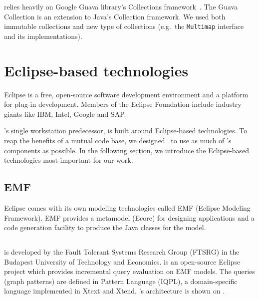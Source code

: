 \iqd{} relies heavily on Google Guava library's Collections framework~\cite{guava}. The Guava Collection is an extension to Java's Collection framework. We used both immutable collections and new type of collections (e.g.\ the \texttt{Multimap} interface and its implementations).

\section{Eclipse-based technologies}

Eclipse is a free, open-source software development environment and a platform for plug-in development. Members of the Eclipse Foundation include industry giants like IBM, Intel, Google and SAP.

\iqd{}'s single workstation predecessor, \eiq{} is built around Eclipse-based technologies. To reap the benefits of a mutual code base, we designed \iqd\ to use as much of \eiq's components as possible. In the following section, we introduce the Eclipse-based technologies most important for our work.

\subsection{EMF}
\label{subsec:EMF}

Eclipse comes with its own modeling technologies called EMF (Eclipse Modeling Framework). EMF provides a metamodel (Ecore) for designing applications and a code generation facility to produce the Java classes for the model.

\subsection{\eiq{}}
\label{subsec:eiq}

\eiq{} is developed by the Fault Tolerant Systems Research Group (FTSRG) in the Budapest University of Technology and Economics. \eiq{} is an open-source Eclipse project which provides incremental query evaluation on EMF models. The queries (graph patterns) are defined in \iq{} Pattern Language (IQPL), a domain-specific language implemented in Xtext and Xtend. \eiq{}'s architecture is shown on .



